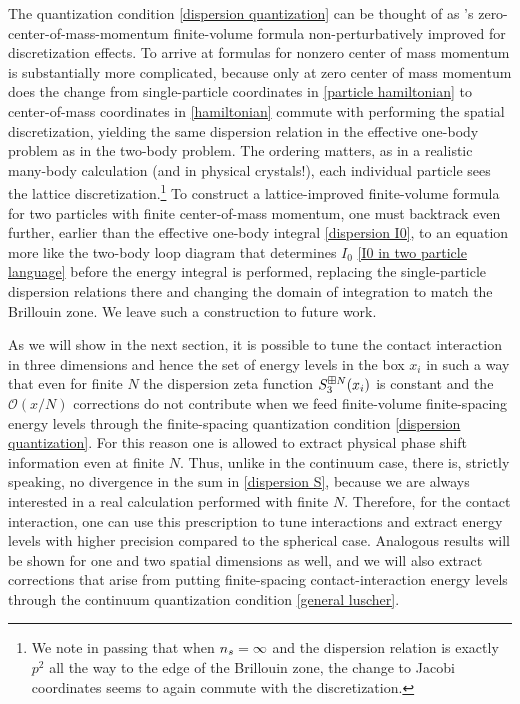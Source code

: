 The quantization condition \eqref{dispersion quantization} can be thought of as \Luscher's zero-center-of-mass-momentum finite-volume formula non-perturbatively improved for discretization effects.
To arrive at formulas for nonzero center of mass momentum is substantially more complicated, because only at zero center of mass momentum does the change from single-particle coordinates in \eqref{particle hamiltonian} to center-of-mass coordinates in \eqref{hamiltonian} commute with performing the spatial discretization, yielding the same dispersion relation in the effective one-body problem as in the two-body problem.
The ordering matters, as in a realistic many-body calculation (and in physical crystals!), each individual particle sees the lattice discretization.\footnote{
We note in passing that when ${n_s}=\infty$ and the dispersion relation is exactly $p^2$ all the way to the edge of the Brillouin zone, the change to Jacobi coordinates seems to again commute with the discretization.}
To construct a lattice-improved finite-volume formula for two particles with finite center-of-mass momentum, one must backtrack even further, earlier than the effective one-body integral \eqref{dispersion I0}, to an equation more like the two-body loop diagram that determines $I_0$ \eqref{I0 in two particle language} before the energy integral is performed, replacing the single-particle dispersion relations there and changing the domain of integration to match the Brillouin zone.
We leave such a construction to future work.

As we will show in the next section, it is possible to tune the contact interaction in three dimensions and hence the set of energy levels in the box $x_i$ in such a way that even for finite $N$ the dispersion zeta function $S^{\boxplus N}_{3}( x_i )$ is constant and the $\mathcal O (x/N)$ corrections do not contribute when we feed finite-volume finite-spacing energy levels through the finite-spacing quantization condition \eqref{dispersion quantization}.
For this reason one is allowed to extract physical phase shift information even at finite $N$.
Thus, unlike in the continuum case, there is, strictly speaking, no divergence in the sum in \eqref{dispersion S}, because we are always interested in a real calculation performed with finite $N$.
Therefore, for the contact interaction, one can use this prescription to tune interactions and extract energy levels with higher precision compared to the spherical case.
Analogous results will be shown for one and two spatial dimensions as well, and we will also extract corrections that arise from putting finite-spacing contact-interaction energy levels through the continuum quantization condition \eqref{general luscher}.


